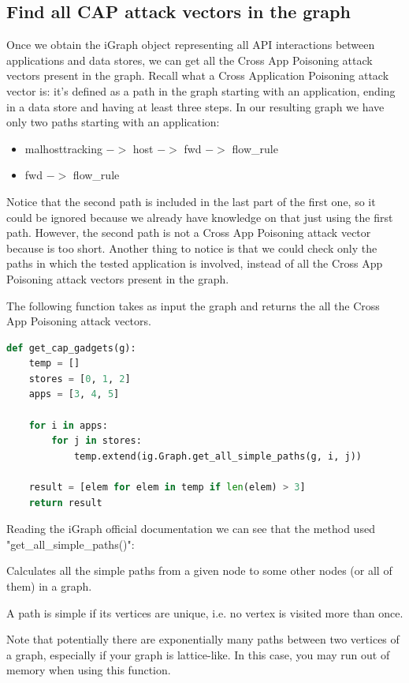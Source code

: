 \subsection{Find all CAP attack vectors in the graph}
Once we obtain the iGraph object representing all API interactions between applications and data stores, we can get all the Cross App Poisoning attack vectors present in the graph. Recall what a  Cross Application Poisoning attack vector is: it's defined as a path in the graph starting with an application, ending in a data store and having at least three steps. In our resulting graph we have only two paths starting with an application:
\begin{itemize}
    \item malhosttracking $->$ host $->$ fwd $->$ flow\_rule
    \item fwd $->$ flow\_rule
\end{itemize}

Notice that the second path is included in the last part of the first one, so it could be ignored because we already have knowledge on that just using the first path. However, the second path is not a Cross App Poisoning attack vector because is too short. Another thing to notice is that we could check only the paths in which the tested application is involved, instead of all the Cross App Poisoning attack vectors present in the graph.

The following function takes as input the graph and returns the all the Cross App Poisoning attack vectors.
\begin{lstlisting}[language=python,firstnumber=113]
def get_cap_gadgets(g):
    temp = []
    stores = [0, 1, 2]
    apps = [3, 4, 5]

    for i in apps:
        for j in stores:
            temp.extend(ig.Graph.get_all_simple_paths(g, i, j))

    result = [elem for elem in temp if len(elem) > 3]
    return result
\end{lstlisting}

Reading the iGraph official documentation \cite{igraph-api} we can see that the method used\\ "get\_all\_simple\_paths()":
\begin{quoting}[font=itshape, begintext={"}, endtext={"}]
Calculates all the simple paths from a given node to some other nodes (or all of them) in a graph.

A path is simple if its vertices are unique, i.e. no vertex is visited more than once.

Note that potentially there are exponentially many paths between two vertices of a graph, especially if your graph is lattice-like. In this case, you may run out of memory when using this function.
\end{quoting}

